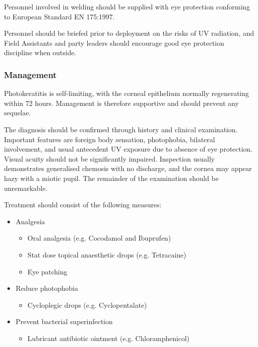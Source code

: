 \documentclass[12pt,a4paper]{article}
\begin{document}
Personnel involved in welding should be supplied with eye protection conforming to European Standard EN 175:1997.

Personnel should be briefed prior to deployment on the risks of UV radiation, and Field Assistants and party leaders should encourage good eye protection discipline when outside.

\subsubsection{Management}

Photokeratitis is self-limiting, with the corneal epithelium normally regenerating within 72 hours. Management is therefore supportive and should prevent any sequelae.

The diagnosis should be confirmed through history and clinical examination. Important features are foreign body sensation, photophobia, bilateral involvement, and usual antecedent UV exposure due to absence of eye protection. Visual acuity should not be significantly impaired. Inspection usually demonstrates generalised chemosis with no discharge, and the cornea may appear hazy with a miotic pupil. The remainder of the examination should be unremarkable.\cite{Auerbach:2012tq}

Treatment should consist of the following measures:\cite{Auerbach:2012tq}

\begin{itemize}
    \item Analgesia
    \begin{itemize}
        \item Oral analgesia (e.g. Cocodamol and Ibuprufen)
        \item Stat dose topical anaesthetic drops (e.g. Tetracaine)
        \item Eye patching
    \end{itemize}
    \item Reduce photophobia
    \begin{itemize}
        \item Cycloplegic drops (e.g. Cyclopentalate)
    \end{itemize}
    \item Prevent bacterial superinfection
    \begin{itemize}
        \item Lubricant antibiotic ointment (e.g. Chloramphenicol)
    \end{itemize}
\end{itemize}
\end{document}
